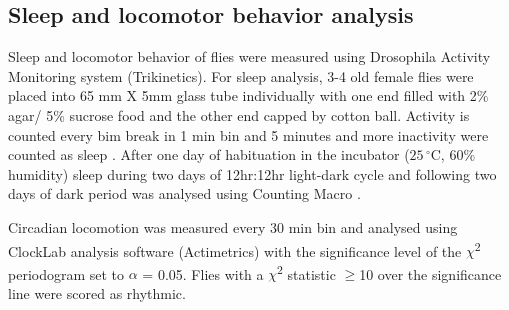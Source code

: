 \subsection*{Sleep and locomotor behavior analysis}

Sleep and locomotor behavior of flies were measured using Drosophila Activity Monitoring system (Trikinetics).
For sleep analysis, 3-4 old female flies were placed into 65 mm X 5mm glass tube individually with one end filled with 2\% agar/ 5\% sucrose food and the other end capped by cotton ball.
Activity is counted every bim break in 1 min bin and 5 minutes and more inactivity were counted as sleep \cite{10710313}.
After one day of habituation in the incubator ($25\,^{\circ}\mathrm{C}$, 60\% humidity) sleep during two days of 12hr:12hr light-dark cycle and following two days of dark period was analysed using Counting Macro \cite{21041393}.

Circadian locomotion was measured every 30 min bin and analysed using ClockLab analysis software (Actimetrics) with the significance level of the $\chi$\textsuperscript{2} periodogram set to $\alpha$ = 0.05.
Flies with a $\chi$\textsuperscript{2} statistic $\geq$10 over the significance line were scored as rhythmic.
    
  
  
  
  
  
  